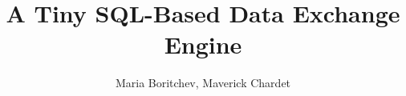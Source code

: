 \documentclass[a4paper,11pt]{article}
\title{A Tiny SQL-Based Data Exchange Engine}
\author{Maria Boritchev, Maverick Chardet}
\begin{document}
\maketitle

\newpage

\section{}
\end{document}
